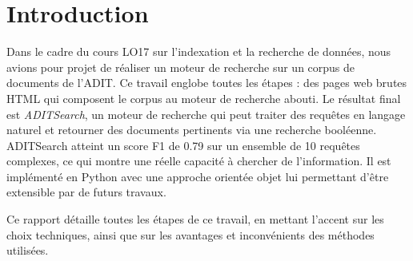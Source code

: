 \chapter*{Introduction}
Dans le cadre du cours LO17 sur l'indexation et la recherche de données, nous avions pour projet de réaliser un moteur de recherche sur un corpus de documents de l'ADIT. Ce travail englobe toutes les étapes : des pages web brutes HTML qui composent le corpus au moteur de recherche abouti. Le résultat final est \textit{ADITSearch}, un moteur de recherche qui peut traiter des requêtes en langage naturel et retourner des documents pertinents via une recherche booléenne. ADITSearch atteint un score F1 de 0.79 sur un ensemble de 10 requêtes complexes, ce qui montre une réelle capacité à chercher de l'information. Il est implémenté en Python avec une approche orientée objet lui permettant d'être extensible par de futurs travaux.

Ce rapport détaille toutes les étapes de ce travail, en mettant l'accent sur les choix techniques, ainsi que sur les avantages et inconvénients des méthodes utilisées.